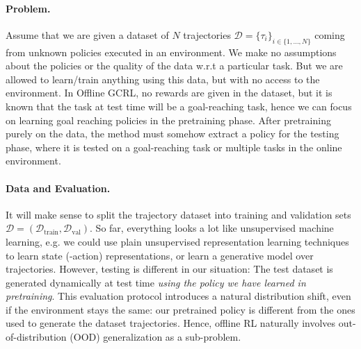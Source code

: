 \documentclass{article}
\theoremstyle{plain}
\theoremstyle{definition}
\theoremstyle{remark}
\begin{document}
\paragraph{Problem.} Assume that we are given a dataset of $N$ trajectories $\mathcal{D} = \{\tau_i\}_{i\in\{1,...,N\}}$ coming from unknown policies executed in an environment. We make no assumptions about the policies or the quality of the data w.r.t a particular task. 
But we are allowed to learn/train anything using this data, but with no access to the environment. In Offline GCRL, no rewards are given in the dataset, but it is known that the task at test time will be a goal-reaching task, hence we can focus on learning goal reaching policies in the pretraining phase.
After pretraining purely on the data, the method must somehow extract a policy for the testing phase, where it is tested on a goal-reaching task or multiple tasks in the online environment. 

\paragraph{Data and Evaluation.} It will make sense to split the trajectory dataset into training and validation sets $\mathcal{D} = (\mathcal{D}_\textrm{train}, \mathcal{D}_\textrm{val})$. 
So far, everything looks a lot like unsupervised machine learning, e.g. we could use plain unsupervised representation learning  techniques to learn state (-action) representations, or learn a generative model over trajectories. 
However, testing is different in our situation: The test dataset is generated dynamically at test time \textit{using the policy we have learned in pretraining}. 
This evaluation protocol introduces a natural distribution shift, even if the environment stays the same: our pretrained policy is different from the ones used to generate the dataset trajectories. Hence, offline RL naturally involves out-of-distribution (OOD) generalization as a sub-problem.
\end{document}
